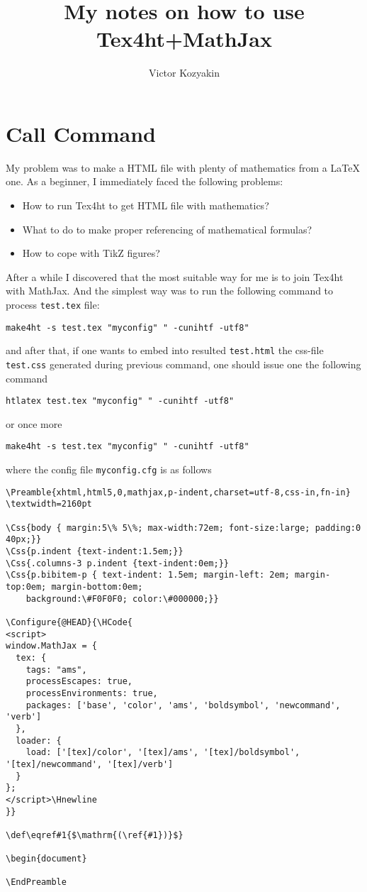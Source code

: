 \documentclass{article}
\title{My notes on how to use Tex4ht+MathJax}
\author{Victor Kozyakin}
\begin{document}
\maketitle

\section{Call Command}\label{S1}
My problem was to make a HTML file with plenty of mathematics from a \LaTeX{}
one. As a beginner, I immediately faced the following problems:
\begin{itemize}
  \item How to run Tex4ht to get HTML file with mathematics?
  \item What to do to make proper referencing of mathematical formulas?
  \item How to cope with TikZ figures?
\end{itemize}

After a while I discovered that the most suitable way for me is to join
Tex4ht with MathJax. And the simplest way was to run the following command to
process \verb|test.tex| file:

{\small
\begin{verbatim}
make4ht -s test.tex "myconfig" " -cunihtf -utf8"
\end{verbatim}}
\noindent and after that, if one wants to embed into resulted
\verb|test.html| the css-file \verb|test.css| generated during previous
command, one should issue one the following command {\small
    \begin{verbatim}
htlatex test.tex "myconfig" " -cunihtf -utf8"
\end{verbatim}
    \noindent or once more
    \begin{verbatim}
make4ht -s test.tex "myconfig" " -cunihtf -utf8"
\end{verbatim}}
\noindent where the config file \verb|myconfig.cfg| is as
follows

  {\small
    \begin{verbatim}
\Preamble{xhtml,html5,0,mathjax,p-indent,charset=utf-8,css-in,fn-in}
\textwidth=2160pt

\Css{body { margin:5\% 5\%; max-width:72em; font-size:large; padding:0 40px;}}
\Css{p.indent {text-indent:1.5em;}}
\Css{.columns-3 p.indent {text-indent:0em;}}
\Css{p.bibitem-p { text-indent: 1.5em; margin-left: 2em; margin-top:0em; margin-bottom:0em;
    background:\#F0F0F0; color:\#000000;}}

\Configure{@HEAD}{\HCode{
<script>
window.MathJax = {
  tex: {
    tags: "ams",
    processEscapes: true,
    processEnvironments: true,
    packages: ['base', 'color', 'ams', 'boldsymbol', 'newcommand', 'verb']
  },
  loader: {
    load: ['[tex]/color', '[tex]/ams', '[tex]/boldsymbol', '[tex]/newcommand', '[tex]/verb']
  }
};
</script>\Hnewline
}}

\def\eqref#1{$\mathrm{(\ref{#1})}$}

\begin{document}

\EndPreamble
\end{verbatim}}
\end{document}
